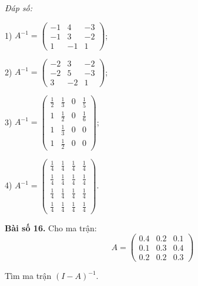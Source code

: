         \textit{Đáp số:}

        1) \(A^{-1} = \begin{pmatrix}
        -1 & 4 & -3 \\
        -1 & 3 & -2 \\
        1 & -1 & 1
        \end{pmatrix}\);\\
        \vspace*{0.5cm}

        2) \(A^{-1} = \begin{pmatrix}
        -2 & 3 & -2 \\
        -2 & 5 & -3 \\
        3 & -2 & 1
        \end{pmatrix}\);\\
        \vspace*{0.5cm}

        3) \(A^{-1} = \begin{pmatrix}
        \frac{1}{2} & \frac{1}{3} & 0 & \frac{1}{5} \\
        1 & \frac{1}{2} & 0 & \frac{1}{6} \\
        1 & \frac{1}{3} & 0 & 0 \\
        1 & \frac{1}{2} & 0 & 0
        \end{pmatrix}\);\\
        \vspace*{0.5cm}

        4) \(A^{-1} = \begin{pmatrix}
        \frac{1}{4} & \frac{1}{4} & \frac{1}{4} & \frac{1}{4} \\
        \frac{1}{4} & \frac{1}{4} & \frac{1}{4} & \frac{1}{4} \\
        \frac{1}{4} & \frac{1}{4} & \frac{1}{4} & \frac{1}{4} \\
        \frac{1}{4} & \frac{1}{4} & \frac{1}{4} & \frac{1}{4}
        \end{pmatrix}\).\\
        \vspace*{0.5cm}

        \textbf{Bài số 16.} Cho ma trận:
        \[
        A = \begin{pmatrix}
        0.4 & 0.2 & 0.1 \\
        0.1 & 0.3 & 0.4 \\
        0.2 & 0.2 & 0.3
        \end{pmatrix}
        \]
        
        Tìm ma trận \((I - A)^{-1}\).
        
